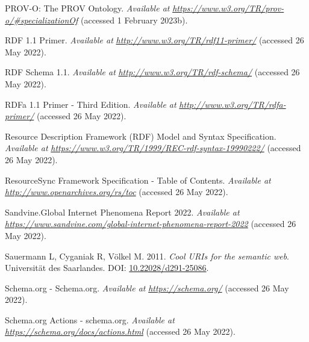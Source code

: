 \begin{CSLReferences}{1}{0}
\leavevmode{}%
PROV-O: The PROV Ontology. \emph{Available at} \href{https://www.w3.org/TR/prov-o/\#specializationOf}{\emph{https://www.w3.org/TR/prov-o/\#specializationOf}} (accessed 1 February 2023b).

\leavevmode{}%
RDF 1.1 Primer. \emph{Available at} \href{http://www.w3.org/TR/rdf11-primer/}{\emph{http://www.w3.org/TR/rdf11-primer/}} (accessed 26 May 2022).

\leavevmode{}%
RDF Schema 1.1. \emph{Available at} \href{http://www.w3.org/TR/rdf-schema/}{\emph{http://www.w3.org/TR/rdf-schema/}} (accessed 26 May 2022).

\leavevmode{}%
RDFa 1.1 Primer - Third Edition. \emph{Available at} \href{http://www.w3.org/TR/rdfa-primer/}{\emph{http://www.w3.org/TR/rdfa-primer/}} (accessed 26 May 2022).

\leavevmode{}%
Resource Description Framework (RDF) Model and Syntax Specification. \emph{Available at} \href{https://www.w3.org/TR/1999/REC-rdf-syntax-19990222/}{\emph{https://www.w3.org/TR/1999/REC-rdf-syntax-19990222/}} (accessed 26 May 2022).

\leavevmode{}%
ResourceSync Framework Specification - Table of Contents. \emph{Available at} \href{http://www.openarchives.org/rs/toc}{\emph{http://www.openarchives.org/rs/toc}} (accessed 26 May 2022).

\leavevmode{}%
Sandvine.Global Internet Phenomena Report 2022. \emph{Available at} \href{https://www.sandvine.com/global-internet-phenomena-report-2022}{\emph{https://www.sandvine.com/global-internet-phenomena-report-2022}} (accessed 26 May 2022).

\leavevmode{}%
Sauermann L, Cyganiak R, Völkel M. 2011. \emph{Cool URIs for the semantic web}. Universität des Saarlandes. DOI: \href{https://doi.org/10.22028/d291-25086}{10.22028/d291-25086}.

\leavevmode{}%
Schema.org - Schema.org. \emph{Available at} \href{https://schema.org/}{\emph{https://schema.org/}} (accessed 26 May 2022).

\leavevmode{}%
Schema.org Actions - schema.org. \emph{Available at} \href{https://schema.org/docs/actions.html}{\emph{https://schema.org/docs/actions.html}} (accessed 26 May 2022).


\end{CSLReferences}

